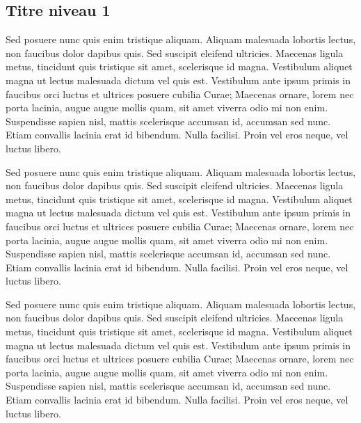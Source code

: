 \documentclass{FramateX}
\begin{document}
\begin{refsection}
\section*{Titre niveau 1}
{}

Sed posuere nunc quis enim tristique aliquam. Aliquam malesuada lobortis lectus, non faucibus dolor dapibus quis. Sed suscipit eleifend ultricies. Maecenas ligula metus, tincidunt quis tristique sit amet, scelerisque id magna. Vestibulum aliquet magna ut lectus malesuada dictum vel quis est. Vestibulum ante ipsum primis in faucibus orci luctus et ultrices posuere cubilia Curae; Maecenas ornare, lorem nec porta lacinia, augue augue mollis quam, sit amet viverra odio mi non enim. Suspendisse sapien nisl, mattis scelerisque accumsan id, accumsan sed nunc. Etiam convallis lacinia erat id bibendum. Nulla facilisi. Proin vel eros neque, vel luctus libero.


Sed posuere nunc quis enim tristique aliquam. Aliquam malesuada lobortis lectus, non faucibus dolor dapibus quis. Sed suscipit eleifend ultricies. Maecenas ligula metus, tincidunt quis tristique sit amet, scelerisque id magna. Vestibulum aliquet magna ut lectus malesuada dictum vel quis est. Vestibulum ante ipsum primis in faucibus orci luctus et ultrices posuere cubilia Curae; Maecenas ornare, lorem nec porta lacinia, augue augue mollis quam, sit amet viverra odio mi non enim. Suspendisse sapien nisl, mattis scelerisque accumsan id, accumsan sed nunc. Etiam convallis lacinia erat id bibendum. Nulla facilisi. Proin vel eros neque, vel luctus libero.


Sed posuere nunc quis enim tristique aliquam. Aliquam malesuada lobortis lectus, non faucibus dolor dapibus quis. Sed suscipit eleifend ultricies. Maecenas ligula metus, tincidunt quis tristique sit amet, scelerisque id magna. Vestibulum aliquet magna ut lectus malesuada dictum vel quis est. Vestibulum ante ipsum primis in faucibus orci luctus et ultrices posuere cubilia Curae; Maecenas ornare, lorem nec porta lacinia, augue augue mollis quam, sit amet viverra odio mi non enim. Suspendisse sapien nisl, mattis scelerisque accumsan id, accumsan sed nunc. Etiam convallis lacinia erat id bibendum. Nulla facilisi. Proin vel eros neque, vel luctus libero.


\end{refsection}


                        
\end{document}
